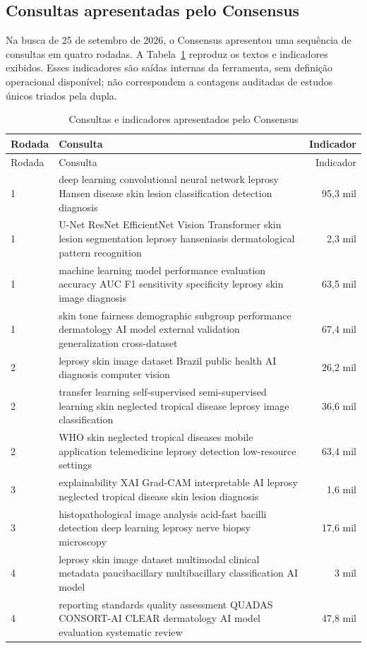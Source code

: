 \subsection{Consultas apresentadas pelo Consensus}

Na busca de 25 de setembro de 2026, o Consensus apresentou uma sequência
de consultas em quatro rodadas. A Tabela~\ref{tab:consultas-consensus}
reproduz os textos e indicadores exibidos. Esses indicadores são saídas
internas da ferramenta, sem definição operacional disponível; não
correspondem a contagens auditadas de estudos únicos triados pela dupla.

\begin{longtable}{p{}p{}r}
\caption{Consultas e indicadores apresentados pelo Consensus}\label{tab:consultas-consensus}\\
\toprule
Rodada & Consulta & Indicador \\
\midrule
\endfirsthead
\toprule Rodada & Consulta & Indicador \\
\midrule
\endhead
1 & deep learning convolutional neural network leprosy Hansen disease skin lesion classification detection diagnosis & 95,3 mil \\
1 & U-Net ResNet EfficientNet Vision Transformer skin lesion segmentation leprosy hanseniasis dermatological pattern recognition & 2,3 mil \\
1 & machine learning model performance evaluation accuracy AUC F1 sensitivity specificity leprosy skin image diagnosis & 63,5 mil \\
1 & skin tone fairness demographic subgroup performance dermatology AI model external validation generalization cross-dataset & 67,4 mil \\
2 & leprosy skin image dataset Brazil public health AI diagnosis computer vision & 26,2 mil \\
2 & transfer learning self-supervised semi-supervised learning skin neglected tropical disease leprosy image classification & 36,6 mil \\
2 & WHO skin neglected tropical diseases mobile application telemedicine leprosy detection low-resource settings & 63,4 mil \\
3 & explainability XAI Grad-CAM interpretable AI leprosy neglected tropical disease skin lesion diagnosis & 1,6 mil \\
3 & histopathological image analysis acid-fast bacilli detection deep learning leprosy nerve biopsy microscopy & 17,6 mil \\
4 & leprosy skin image dataset multimodal clinical metadata paucibacillary multibacillary classification AI model & 3 mil \\
4 & reporting standards quality assessment QUADAS CONSORT-AI CLEAR dermatology AI model evaluation systematic review & 47,8 mil \\
\bottomrule
\end{longtable}


